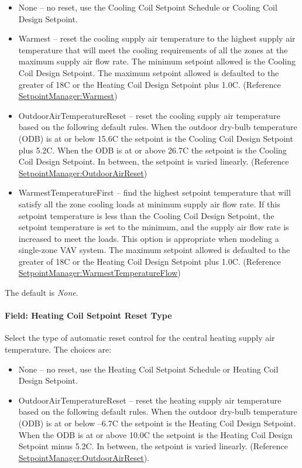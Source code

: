\begin{itemize}
\item
  None -- no reset, use the Cooling Coil Setpoint Schedule or Cooling Coil Design Setpoint.
\item
  Warmest -- reset the cooling supply air temperature to the highest supply air temperature that will meet the cooling requirements of all the zones at the maximum supply air flow rate. The minimum setpoint allowed is the Cooling Coil Design Setpoint. The maximum setpoint allowed is defaulted to the greater of 18C or the Heating Coil Design Setpoint plus 1.0C. (Reference \hyperref[setpointmanagerwarmest]{SetpointManager:Warmest})
\item
  OutdoorAirTemperatureReset -- reset the cooling supply air temperature based on the following default rules. When the outdoor dry-bulb temperature (ODB) is at or below 15.6C the setpoint is the Cooling Coil Design Setpoint plus 5.2C. When the ODB is at or above 26.7C the setpoint is the Cooling Coil Design Setpoint. In between, the setpoint is varied linearly. (Reference \hyperref[setpointmanageroutdoorairreset]{SetpointManager:OutdoorAirReset})
\item
  WarmestTemperatureFirst -- find the highest setpoint temperature that will satisfy all the zone cooling loads at minimum supply air flow rate. If this setpoint temperature is less than the Cooling Coil Design Setpoint, the setpoint temperature is set to the minimum, and the supply air flow rate is increased to meet the loads. This option is appropriate when modeling a single-zone VAV system. The maximum setpoint allowed is defaulted to the greater of 18C or the Heating Coil Design Setpoint plus 1.0C. (Reference \hyperref[setpointmanagerwarmesttemperatureflow]{SetpointManager:WarmestTemperatureFlow})
\end{itemize}

The default is \emph{None}.

\paragraph{Field: Heating Coil Setpoint Reset Type}\label{field-heating-coil-setpoint-reset-type}

Select the type of automatic reset control for the central heating supply air temperature. The choices are:

\begin{itemize}
\item
  None -- no reset, use the Heating Coil Setpoint Schedule or Heating Coil Design Setpoint.
\item
  OutdoorAirTemperatureReset -- reset the heating supply air temperature based on the following default rules. When the outdoor dry-bulb temperature (ODB) is at or below --6.7C the setpoint is the Heating Coil Design Setpoint. When the ODB is at or above 10.0C the setpoint is the Heating Coil Design Setpoint minus 5.2C. In between, the setpoint is varied linearly. (Reference \hyperref[setpointmanageroutdoorairreset]{SetpointManager:OutdoorAirReset}).
\end{itemize}

